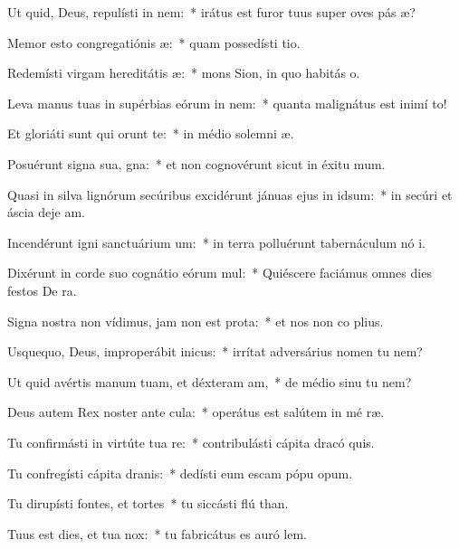\item Ut quid, Deus, repulísti in nem:~* irátus est furor tuus super oves pás æ?
\item Memor esto congregatiónis æ:~* quam possedísti  tio.
\item Redemísti virgam hereditátis æ:~* mons Sion, in quo habitás  o.
\item Leva manus tuas in supérbias eórum in nem:~* quanta malignátus est inimí  to!
\item Et gloriáti sunt qui orunt te:~* in médio solemni æ.
\item Posuérunt signa sua, gna:~* et non cognovérunt sicut in éxitu  mum.
\item Quasi in silva lignórum secúribus excidérunt jánuas ejus in idsum:~* in secúri et áscia deje am.
\item Incendérunt igni sanctuárium um:~* in terra polluérunt tabernáculum nó i.
\item Dixérunt in corde suo cognátio eórum mul:~* Quiéscere faciámus omnes dies festos De  ra.
\item Signa nostra non vídimus, jam non est prota:~* et nos non co plius.
\item Usquequo, Deus, improperábit inicus:~* irrítat adversárius nomen tu  nem?
\item Ut quid avértis manum tuam, et déxteram am,~* de médio sinu tu  nem?
\item Deus autem Rex noster ante cula:~* operátus est salútem in mé ræ.
\item Tu confirmásti in virtúte tua re:~* contribulásti cápita dracó  quis.
\item Tu confregísti cápita dranis:~* dedísti eum escam pópu opum.
\item Tu dirupísti fontes, et tortes~* tu siccásti flú than.
\item Tuus est dies, et tua  nox:~* tu fabricátus es auró  lem.
